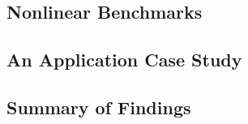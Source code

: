 \subsection{Nonlinear Benchmarks}

\subsection{An Application Case Study}

\subsection{Summary of Findings}
